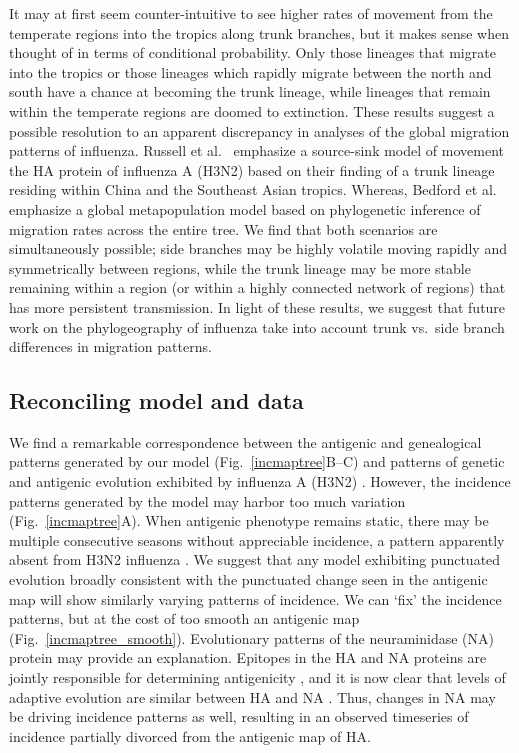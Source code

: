 \documentclass[11pt,oneside,letterpaper]{article}
\begin{document}
It may at first seem counter-intuitive to see higher rates of movement from the temperate regions into the tropics along trunk branches, but it makes sense when thought of in terms of conditional probability.  Only those lineages that migrate into the tropics or those lineages which rapidly migrate between the north and south have a chance at becoming the trunk lineage, while lineages that remain within the temperate regions are doomed to extinction.  These results suggest a possible resolution to an apparent discrepancy in analyses of the global migration patterns of influenza.  Russell et al.\ \cite{Russell08} emphasize a source-sink model of movement the HA protein of influenza A (H3N2) based on their finding of a trunk lineage residing within China and the Southeast Asian tropics.  Whereas, Bedford et al.\ \cite{Bedford10} emphasize a global metapopulation model based on phylogenetic inference of migration rates across the entire tree.  We find that both scenarios are simultaneously possible; side branches may be highly volatile moving rapidly and symmetrically between regions, while the trunk lineage may be more stable remaining within a region (or within a highly connected network of regions) that has more persistent transmission.  In light of these results, we suggest that future work on the phylogeography of influenza take into account trunk vs.\ side branch differences in migration patterns.

\subsection*{Reconciling model and data}

We find a remarkable correspondence between the antigenic and genealogical patterns generated by our model (Fig.~\ref{incmaptree}B--C) and patterns of genetic and antigenic evolution exhibited by influenza A (H3N2) \cite{Fitch97,Smith04}.  However, the incidence patterns generated by the model may harbor too much variation (Fig.~\ref{incmaptree}A).  When antigenic phenotype remains static, there may be multiple consecutive seasons without appreciable incidence, a pattern apparently absent from H3N2 influenza \cite{Finkelman07}.  We suggest that any model exhibiting punctuated evolution broadly consistent with the punctuated change seen in the antigenic map will show similarly varying patterns of incidence.  We can `fix' the incidence patterns, but at the cost of too smooth an antigenic map (Fig.~\ref{incmaptree_smooth}).  Evolutionary patterns of the neuraminidase (NA) protein may provide an explanation.  Epitopes in the HA and NA proteins are jointly responsible for determining antigenicity \cite{Nelson07NatRevGenet}, and it is now clear that levels of adaptive evolution are similar between HA and NA \cite{Bhatt11}.  Thus, changes in NA may be driving incidence patterns as well, resulting in an observed timeseries of incidence partially divorced from the antigenic map of HA.
\end{document}
